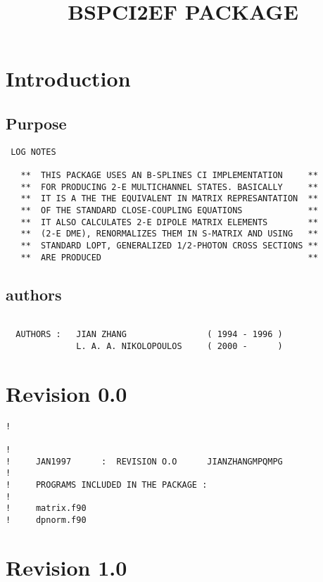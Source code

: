 

\title{ BSPCI2EF PACKAGE }



\section{Introduction}

\subsection{Purpose}
\begin{verbatim}
 LOG NOTES

   **  THIS PACKAGE USES AN B-SPLINES CI IMPLEMENTATION     **
   **  FOR PRODUCING 2-E MULTICHANNEL STATES. BASICALLY     **
   **  IT IS A THE THE EQUIVALENT IN MATRIX REPRESANTATION  ** 
   **  OF THE STANDARD CLOSE-COUPLING EQUATIONS             **
   **  IT ALSO CALCULATES 2-E DIPOLE MATRIX ELEMENTS        **
   **  (2-E DME), RENORMALIZES THEM IN S-MATRIX AND USING   **
   **  STANDARD LOPT, GENERALIZED 1/2-PHOTON CROSS SECTIONS **
   **  ARE PRODUCED                                         **
\end{verbatim}


\subsection{authors}

\begin{verbatim}

  AUTHORS :   JIAN ZHANG                ( 1994 - 1996 )    
              L. A. A. NIKOLOPOULOS     ( 2000 -      )    

\end{verbatim}


\section{ Revision 0.0 }

\begin{verbatim}
!

!
!     JAN1997      :  REVISION O.O      JIANZHANGMPQMPG
!                     
!     PROGRAMS INCLUDED IN THE PACKAGE :
!     
!     matrix.f90
!     dpnorm.f90

\end{verbatim}

\section{ Revision 1.0 }

